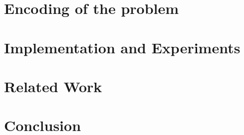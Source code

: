 \documentclass[draft]{llncs}
\begin{document}
\section{Encoding of the problem}
\label{sec:encoding}


\section{Implementation and Experiments}
\label{sec:experiments}


\section{Related Work}
\label{sec:related}


\section{Conclusion}
\label{sec:conclusion}





\appendix
\clearpage
\end{document}
